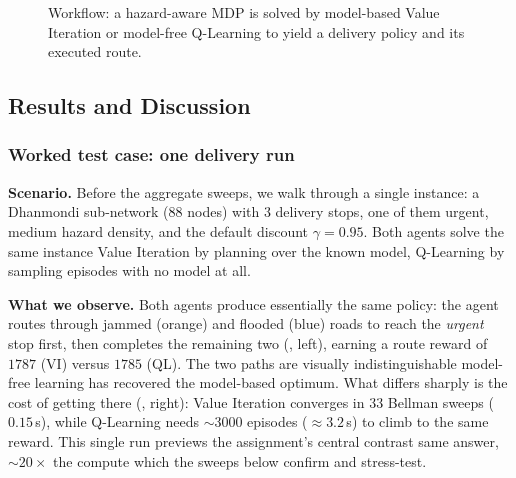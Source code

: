 \documentclass{ai-lab-report}
\begin{document}
\begin{figure}[H]
  \centering
  \caption{Workflow: a hazard-aware MDP is solved by model-based Value Iteration or model-free Q-Learning to yield a delivery policy and its executed route.}
  \label{fig:a4workflow}
\end{figure}

\subsection{Results and Discussion}
\label{sec:a4results}

\subsubsection{Worked test case: one delivery run}
\textbf{Scenario.} Before the aggregate sweeps, we walk through a single instance: a Dhanmondi sub-network ($88$ nodes) with $3$ delivery stops, one of them urgent, medium hazard density, and the default discount $\gamma{=}0.95$. Both agents solve the same instance Value Iteration by planning over the known model, Q-Learning by sampling episodes with no model at all.

\textbf{What we observe.} Both agents produce essentially the same policy: the agent routes through jammed (orange) and flooded (blue) roads to reach the \emph{urgent} stop first, then completes the remaining two (, left), earning a route reward of $1787$ (VI) versus $1785$ (QL). The two paths are visually indistinguishable model-free learning has recovered the model-based optimum. What differs sharply is the cost of getting there (, right): Value Iteration converges in $33$ Bellman sweeps ($0.15$\,s), while Q-Learning needs ${\sim}3000$ episodes ($\approx3.2$\,s) to climb to the same reward. This single run previews the assignment's central contrast same answer, ${\sim}20\times$ the compute which the sweeps below confirm and stress-test.
\end{document}
